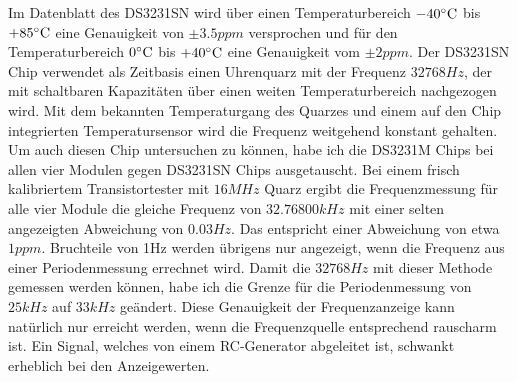 Im Datenblatt des DS3231SN wird über einen Temperaturbereich \(-40\celsius\)  bis \(+85\celsius\)  eine Genauigkeit von \(\pm 3.5ppm\)
versprochen und für den Temperaturbereich \(0\celsius\)  bis \(+40\celsius\)  eine Genauigkeit vom \(\pm 2ppm\).
Der DS3231SN Chip verwendet als Zeitbasis einen Uhrenquarz mit der Frequenz \(32768Hz\), der mit schaltbaren Kapazitäten
über einen weiten Temperaturbereich nachgezogen wird. Mit dem bekannten Temperaturgang des Quarzes und einem
auf den Chip integrierten Temperatursensor wird die Frequenz weitgehend konstant gehalten.
Um auch diesen Chip untersuchen zu können, habe ich die DS3231M Chips bei allen vier Modulen gegen DS3231SN Chips
ausgetauscht. Bei einem frisch kalibriertem Transistortester mit \(16MHz\) Quarz ergibt die Frequenzmessung für alle
vier Module die gleiche Frequenz von \(32.76800kHz\) mit einer selten angezeigten Abweichung von \(0.03Hz\).
Das entspricht einer Abweichung von etwa \(1ppm\).
Bruchteile von 1Hz werden übrigens nur angezeigt, wenn die Frequenz aus einer Periodenmessung errechnet wird.
Damit die \(32768Hz\) mit dieser Methode gemessen werden können, habe ich die Grenze für die Periodenmessung
von \(25kHz\) auf \(33kHz\) geändert.
Diese Genauigkeit der Frequenzanzeige kann natürlich nur erreicht werden, wenn die Frequenzquelle entsprechend rauscharm ist.
Ein Signal, welches von einem RC-Generator abgeleitet ist, schwankt erheblich bei den Anzeigewerten.
